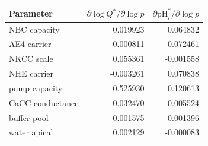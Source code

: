 \begin{tabular}{lrr}
\toprule
Parameter & $\partial\log Q^*/\partial\log p$ & $\partial\mathrm{pH}_i^*/\partial\log p$ \\
\midrule
NBC capacity & 0.019923 & 0.064832 \\
AE4 carrier & 0.000811 & -0.072461 \\
NKCC scale & 0.055361 & -0.001558 \\
NHE carrier & -0.003261 & 0.070838 \\
pump capacity & 0.525930 & 0.120613 \\
CaCC conductance & 0.032470 & -0.005524 \\
buffer pool & -0.001575 & 0.001396 \\
water apical & 0.002129 & -0.000083 \\
\bottomrule
\end{tabular}
